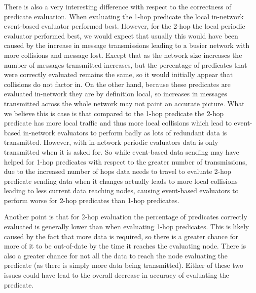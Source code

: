There is also a very interesting difference with respect to the correctness of predicate evaluation. When evaluating the 1-hop predicate the local in-network event-based evaluator performed best. However, for the 2-hop the local periodic evaluator performed best, we would expect that usually this would have been caused by the increase in message transmissions leading to a busier network with more collisions and message lost. Except that as the network size increases the number of messages transmitted increases, but the percentage of predicates that were correctly evaluated remains the same, so it would initially appear that collisions do not factor in. On the other hand, because these predicates are evaluated in-network they are by definition local, so increases in messages transmitted across the whole network may not paint an accurate picture. What we believe this is case is that compared to the 1-hop predicate the 2-hop predicate has more local traffic and thus more local collisions which lead to event-based in-network evaluators to perform badly as lots of redundant data is transmitted. However, with in-network periodic evaluators data is only transmitted when it is asked for. So while event-based data sending may have helped for 1-hop predicates with respect to the greater number of transmissions, due to the increased number of hops data needs to travel to evaluate 2-hop predicate sending data when it changes actually leads to more local collisions leading to less current data reaching nodes, causing event-based evaluators to perform worse for 2-hop predicates than 1-hop predicates.

Another point is that for 2-hop evaluation the percentage of predicates correctly evaluated is generally lower than when evaluating 1-hop predicates. This is likely caused by the fact that more data is required, so there is a greater chance for more of it to be out-of-date by the time it reaches the evaluating node. There is also a greater chance for not all the data to reach the node evaluating the predicate (as there is simply more data being transmitted). Either of these two issues could have lead to the overall decrease in accuracy of evaluating the predicate.



